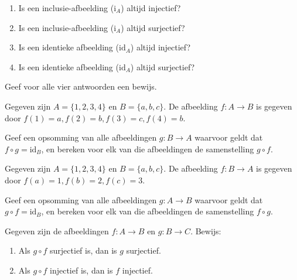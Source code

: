 \begin{exercise}[Optioneel]
\begin{enumerate}[label=\alph*.]
    \item Is een inclusie-afbeelding ($\text{i}_A$) altijd injectief?
    \item Is een inclusie-afbeelding ($\text{i}_A$) altijd surjectief?
    \item Is een identieke afbeelding ($\text{id}_A$) altijd injectief?
    \item Is een identieke afbeelding ($\text{id}_A$) altijd surjectief?
\end{enumerate}
Geef voor alle vier antwoorden een bewijs.
\end{exercise}

\begin{exercise}[Optioneel]
Gegeven zijn $A=\{1,2,3,4\}$ en $B=\{a,b,c\}$. De afbeelding $f:A\rightarrow B$ is gegeven door $f(1)=a, f(2)=b, f(3)=c, f(4)=b$.

Geef een opsomming van alle afbeeldingen $g: B\rightarrow A$ waarvoor geldt dat $f\circ g = \text{id}_B$, en bereken voor elk van die afbeeldingen de samenstelling $g\circ f$.
\end{exercise}

\begin{exercise}[Optioneel]
Gegeven zijn $A=\{1,2,3,4\}$ en $B=\{a,b,c\}$. De afbeelding $f:B\rightarrow A$ is gegeven door $f(a)=1, f(b)=2, f(c)=3$.

Geef een opsomming van alle afbeeldingen $g:A\rightarrow B$ waarvoor geldt dat $g\circ f=\text{id}_B$, en bereken voor elk van die afbeeldingen de samenstelling $f\circ g$.
\end{exercise}

\begin{exercise}[Optioneel]
Gegeven zijn de afbeeldingen $f:A\rightarrow B$ en $g:B\rightarrow C$. Bewijs:
\begin{enumerate}[label=\alph*.]
    \item Als $g\circ f$ surjectief is, dan is $g$ surjectief.
    \item Als $g\circ f$ injectief is, dan is $f$ injectief.
\end{enumerate}
\end{exercise}

